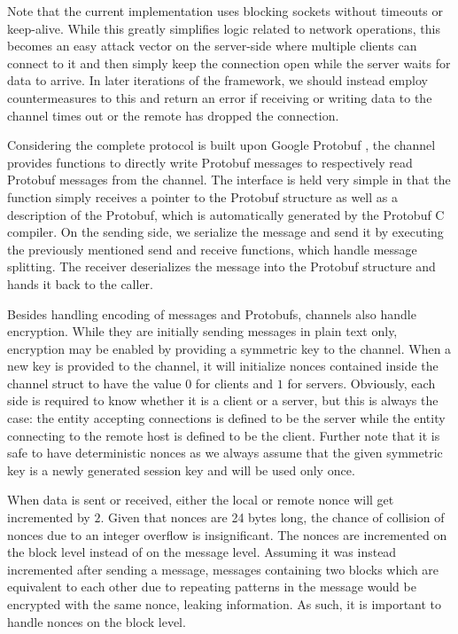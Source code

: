 Note that the current implementation uses blocking sockets without timeouts or keep-alive.
While this greatly simplifies logic related to network operations, this becomes an easy attack vector on the server-side where multiple clients can connect to it and then simply keep the connection open while the server waits for data to arrive.
In later iterations of the framework, we should instead employ countermeasures to this and return an error if receiving or writing data to the channel times out or the remote has dropped the connection.

Considering the complete protocol is built upon Google Protobuf \cite{varda2008protocol}, the channel provides functions to directly write Protobuf messages to respectively read Protobuf messages from the channel.
The interface is held very simple in that the function simply receives a pointer to the Protobuf structure as well as a description of the Protobuf, which is automatically generated by the Protobuf C compiler.
On the sending side, we serialize the message and send it by executing the previously mentioned send and receive functions, which handle message splitting.
The receiver deserializes the message into the Protobuf structure and hands it back to the caller.

Besides handling encoding of messages and Protobufs, channels also handle encryption.
While they are initially sending messages in plain text only, encryption may be enabled by providing a symmetric key to the channel.
When a new key is provided to the channel, it will initialize nonces contained inside the channel struct to have the value $0$ for clients and $1$ for servers.
Obviously, each side is required to know whether it is a client or a server, but this is always the case: the entity accepting connections is defined to be the server while the entity connecting to the remote host is defined to be the client.
Further note that it is safe to have deterministic nonces as we always assume that the given symmetric key is a newly generated session key and will be used only once.

When data is sent or received, either the local or remote nonce will get incremented by $2$.
Given that nonces are 24 bytes long, the chance of collision of nonces due to an integer overflow is insignificant.
The nonces are incremented on the block level instead of on the message level.
Assuming it was instead incremented after sending a message, messages containing two blocks which are equivalent to each other due to repeating patterns in the message would be encrypted with the same nonce, leaking information.
As such, it is important to handle nonces on the block level.

